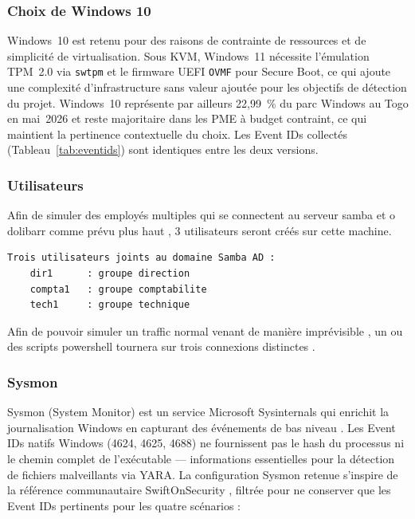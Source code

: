 \documentclass[12pt,a4paper]{article}
\begin{document}
\subsubsection{Choix de Windows 10}
Windows~10 est retenu pour des raisons de contrainte de ressources
et de simplicité de virtualisation. Sous KVM, Windows~11 nécessite
l'émulation TPM~2.0 via \texttt{swtpm} et le firmware UEFI
\texttt{OVMF} pour Secure Boot, ce qui ajoute une complexité
d'infrastructure sans valeur ajoutée pour les objectifs de détection
du projet. Windows~10 représente par ailleurs 22,99~\% du parc
Windows au Togo en mai~2026 \cite{statcounter_togo} et reste
majoritaire dans les PME à budget contraint, ce qui maintient la
pertinence contextuelle du choix. Les Event IDs collectés
(Tableau~\ref{tab:eventids}) sont identiques entre les deux versions.

\subsubsection{Utilisateurs}
Afin de simuler des employés multiples qui se connectent au serveur samba et o dolibarr comme prévu plus haut , 3 utilisateurs seront créés sur cette machine.
\begin{lstlisting}
Trois utilisateurs joints au domaine Samba AD :
    dir1      : groupe direction
    compta1   : groupe comptabilite  
    tech1     : groupe technique
\end{lstlisting}
Afin de pouvoir simuler un traffic normal venant de manière imprévisible , un ou des scripts powershell tournera sur trois connexions distinctes .

\subsubsection{Sysmon}

Sysmon (System Monitor) est un service Microsoft Sysinternals qui enrichit
la journalisation Windows en capturant des événements de bas niveau
\cite{sysmon_docs}. Les Event IDs natifs Windows (4624, 4625, 4688) ne
fournissent pas le hash du processus ni le chemin complet de l'exécutable
--- informations essentielles pour la détection de fichiers malveillants
via YARA. La configuration Sysmon retenue s'inspire de la référence
communautaire SwiftOnSecurity \cite{swifton}, filtrée pour ne conserver
que les Event IDs pertinents pour les quatre scénarios :
\end{document}
